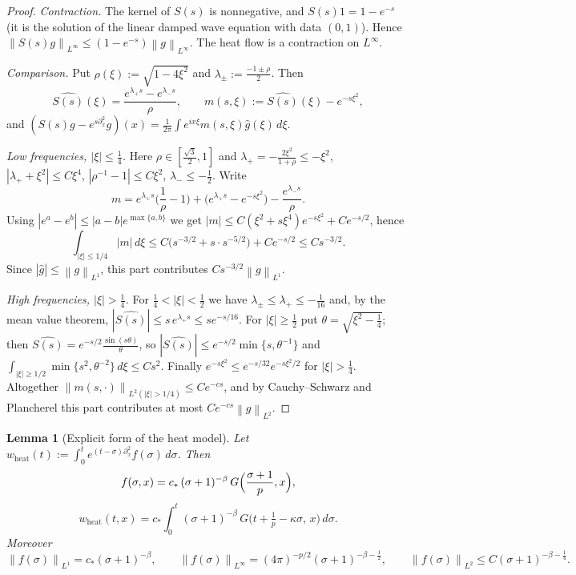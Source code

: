 \documentclass[11pt]{amsart}
\newtheorem{lemma}{Lemma}[section]
\theoremstyle{definition}
\theoremstyle{remark}
\numberwithin{equation}{section}
\newcommand{\pt}{\partial}
\newcommand{\norm}[1]{\left\lVert #1\right\rVert}
\begin{document}
\begin{proof}
\emph{Contraction.} The kernel of $S(s)$ is nonnegative, and $S(s)1=1-e^{-s}$ (it is the solution of the
linear damped wave equation with data $(0,1)$). Hence $\norm{S(s)g}_{L^\infty}\le(1-e^{-s})\norm{g}_{L^\infty}$.
The heat flow is a contraction on $L^\infty$.

\emph{Comparison.} Put $\rho(\xi):=\sqrt{1-4\xi^2}$ and $\lambda_\pm:=\frac{-1\pm\rho}{2}$. Then
\[
\widehat{S(s)}(\xi)=\frac{e^{\lambda_+s}-e^{\lambda_-s}}{\rho},\qquad
m(s,\xi):=\widehat{S(s)}(\xi)-e^{-s\xi^2},
\]
and $(S(s)g-e^{s\pt_x^2}g)(x)=\frac1{2\pi}\int e^{ix\xi}m(s,\xi)\hat g(\xi)\,d\xi$.

\emph{Low frequencies, $|\xi|\le\frac14$.} Here $\rho\in[\frac{\sqrt3}{2},1]$ and
$\lambda_+=-\frac{2\xi^2}{1+\rho}\le-\xi^2$, $|\lambda_++\xi^2|\le C\xi^4$, $|\rho^{-1}-1|\le C\xi^2$,
$\lambda_-\le-\frac12$. Write
\[
m=e^{\lambda_+s}\Big(\frac1\rho-1\Big)+\bigl(e^{\lambda_+s}-e^{-s\xi^2}\bigr)-\frac{e^{\lambda_-s}}{\rho}.
\]
Using $|e^a-e^b|\le|a-b|e^{\max\{a,b\}}$ we get
$|m|\le C(\xi^2+s\xi^4)e^{-s\xi^2}+Ce^{-s/2}$, hence
\[
\int_{|\xi|\le1/4}|m|\,d\xi\le C\bigl(s^{-3/2}+s\cdot s^{-5/2}\bigr)+Ce^{-s/2}\le Cs^{-3/2}.
\]
Since $|\hat g|\le\norm{g}_{L^1}$, this part contributes $Cs^{-3/2}\norm{g}_{L^1}$.

\emph{High frequencies, $|\xi|>\frac14$.} For $\frac14<|\xi|<\frac12$ we have $\lambda_\pm\le\lambda_+\le-\frac1{16}$ and,
by the mean value theorem, $|\widehat{S(s)}|\le s\,e^{\lambda_+s}\le se^{-s/16}$. For $|\xi|\ge\frac12$ put
$\theta=\sqrt{\xi^2-\frac14}$; then $\widehat{S(s)}=e^{-s/2}\frac{\sin(s\theta)}{\theta}$, so
$|\widehat{S(s)}|\le e^{-s/2}\min\{s,\theta^{-1}\}$ and
$\int_{|\xi|\ge1/2}\min\{s^2,\theta^{-2}\}\,d\xi\le Cs^2$. Finally
$e^{-s\xi^2}\le e^{-s/32}e^{-s\xi^2/2}$ for $|\xi|>\frac14$. Altogether
$\norm{m(s,\cdot)}_{L^2(|\xi|>1/4)}\le Ce^{-cs}$, and by Cauchy--Schwarz and Plancherel
this part contributes at most $Ce^{-cs}\norm{g}_{L^2}$.
\end{proof}

\begin{lemma}[Explicit form of the heat model]\label{lem:model-k}
Let $w_{\mathrm{heat}}(t):=\int_0^te^{(t-\sigma)\pt_x^2}f(\sigma)\,d\sigma$. Then
\begin{equation}\label{eq:f-gauss}
f(\sigma,x)=c_*\,(\sigma+1)^{-\beta}\,G\Bigl(\frac{\sigma+1}{p},x\Bigr),
\end{equation}
\begin{equation}\label{eq:w-heat-explicit}
w_{\mathrm{heat}}(t,x)=c_*\int_0^t(\sigma+1)^{-\beta}\,G\bigl(t+\tfrac1p-\kappa\sigma,\,x\bigr)\,d\sigma .
\end{equation}
Moreover
\begin{equation}\label{eq:f-norms}
\norm{f(\sigma)}_{L^1}=c_*(\sigma+1)^{-\beta},\qquad
\norm{f(\sigma)}_{L^\infty}=(4\pi)^{-p/2}(\sigma+1)^{-\beta-\frac12},\qquad
\norm{f(\sigma)}_{L^2}\le C(\sigma+1)^{-\beta-\frac14}.
\end{equation}
\end{lemma}
\end{document}
